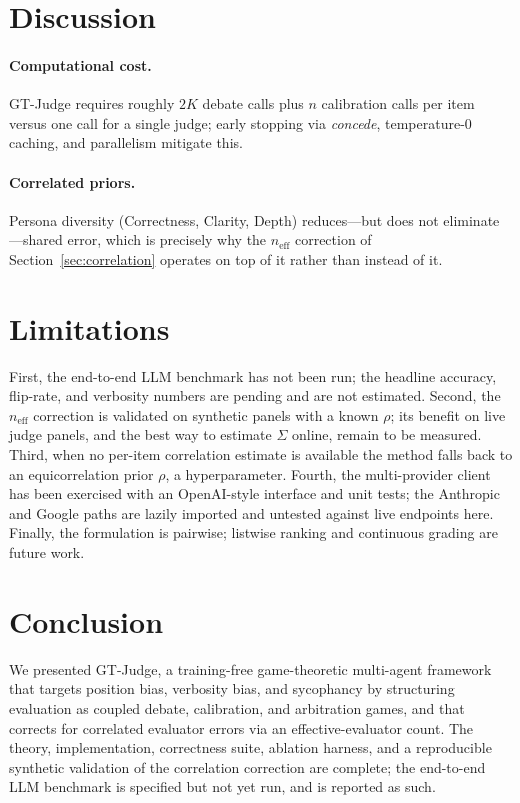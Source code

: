 \documentclass[11pt]{article}
\newcommand{\neff}{n_{\mathrm{eff}}}
\begin{document}
\section{Discussion}
\paragraph{Computational cost.} GT-Judge requires roughly $2K$ debate calls plus
$n$ calibration calls per item versus one call for a single judge; early stopping
via \emph{concede}, temperature-0 caching, and parallelism mitigate this.
\paragraph{Correlated priors.} Persona diversity (Correctness, Clarity, Depth)
reduces---but does not eliminate---shared error, which is precisely why the
$\neff$ correction of Section~\ref{sec:correlation} operates on top of it rather
than instead of it.

\section{Limitations}
First, the end-to-end LLM benchmark has not been run; the headline accuracy,
flip-rate, and verbosity numbers are pending and are not estimated. Second, the
$\neff$ correction is validated on synthetic panels with a known $\rho$; its
benefit on live judge panels, and the best way to estimate $\Sigma$ online,
remain to be measured. Third, when no per-item correlation estimate is available
the method falls back to an equicorrelation prior $\rho$, a hyperparameter.
Fourth, the multi-provider client has been exercised with an OpenAI-style
interface and unit tests; the Anthropic and Google paths are lazily imported and
untested against live endpoints here. Finally, the formulation is pairwise;
listwise ranking and continuous grading are future work.

\section{Conclusion}
We presented GT-Judge, a training-free game-theoretic multi-agent framework that
targets position bias, verbosity bias, and sycophancy by structuring evaluation
as coupled debate, calibration, and arbitration games, and that corrects for
correlated evaluator errors via an effective-evaluator count. The theory,
implementation, correctness suite, ablation harness, and a reproducible
synthetic validation of the correlation correction are complete; the end-to-end
LLM benchmark is specified but not yet run, and is reported as such.
\end{document}

